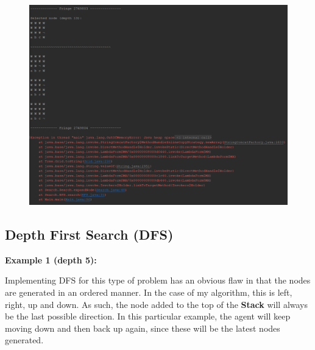 \documentclass{article}
\begin{document}
	\begin{figure}[h]	
		\centering
		\includegraphics[height=0.4\textheight,keepaspectratio]{BFS-2-3.png}
	\end{figure}
	
	\newpage
	\subsection{Depth First Search (DFS)}
	\textbf{Example 1 (depth 5):}
	
	Implementing DFS for this type of problem has an obvious flaw in that the nodes are generated in an ordered manner. In the case of my algorithm, this is left, right, up and down. As such, the node added to the top of the \textbf{Stack} will always be the last possible direction. In this particular example, the agent will keep moving down and then back up again, since these will be the latest nodes generated.
	
\end{document}
